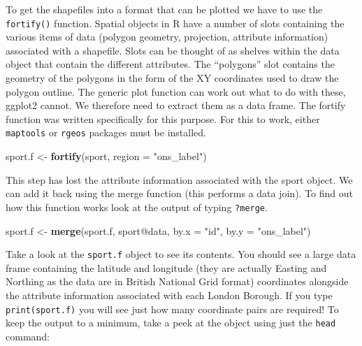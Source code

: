 \documentclass[]{article}
\newenvironment{Shaded}{}{}
\newcommand{\KeywordTok}[1]{\textcolor[rgb]{0.00,0.44,0.13}{\textbf{{#1}}}}
\newcommand{\DataTypeTok}[1]{\textcolor[rgb]{0.56,0.13,0.00}{{#1}}}
\newcommand{\StringTok}[1]{\textcolor[rgb]{0.25,0.44,0.63}{{#1}}}
\newcommand{\NormalTok}[1]{{#1}}
\begin{document}
To get the shapefiles into a format that can be plotted we have to use
the \texttt{fortify()} function. Spatial objects in R have a number of
slots containing the various items of data (polygon geometry,
projection, attribute information) associated with a shapefile. Slots
can be thought of as shelves within the data object that contain the
different attributes. The ``polygons'' slot contains the geometry of the
polygons in the form of the XY coordinates used to draw the polygon
outline. The generic plot function can work out what to do with these,
ggplot2 cannot. We therefore need to extract them as a data frame. The
fortify function was written specifically for this purpose. For this to
work, either \texttt{maptools} or \texttt{rgeos} packages must be
installed.

\begin{Shaded}
\begin{Highlighting}[]
\NormalTok{sport.f <- }\KeywordTok{fortify}\NormalTok{(sport, }\DataTypeTok{region =} \StringTok{"ons_label"}\NormalTok{)}
\end{Highlighting}
\end{Shaded}
This step has lost the attribute information associated with the sport
object. We can add it back using the merge function (this performs a
data join). To find out how this function works look at the output of
typing \texttt{?merge}.

\begin{Shaded}
\begin{Highlighting}[]
\NormalTok{sport.f <- }\KeywordTok{merge}\NormalTok{(sport.f, sport@data, }\DataTypeTok{by.x =} \StringTok{"id"}\NormalTok{, }\DataTypeTok{by.y =} \StringTok{"ons_label"}\NormalTok{)}
\end{Highlighting}
\end{Shaded}
Take a look at the \texttt{sport.f} object to see its contents. You
should see a large data frame containing the latitude and longitude
(they are actually Easting and Northing as the data are in British
National Grid format) coordinates alongside the attribute information
associated with each London Borough. If you type \texttt{print(sport.f)}
you will see just how many coordinate pairs are required! To keep the
output to a minimum, take a peek at the object using just the
\texttt{head} command:
\end{document}

